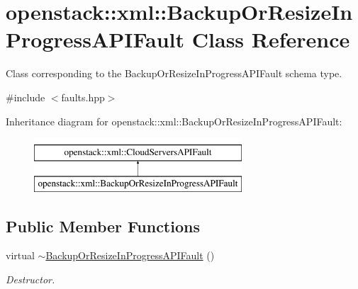 \hypertarget{classopenstack_1_1xml_1_1BackupOrResizeInProgressAPIFault}{
\section{openstack::xml::BackupOrResizeInProgressAPIFault Class Reference}
\label{classopenstack_1_1xml_1_1BackupOrResizeInProgressAPIFault}
}


Class corresponding to the BackupOrResizeInProgressAPIFault schema type.  




{\ttfamily \#include $<$faults.hpp$>$}

Inheritance diagram for openstack::xml::BackupOrResizeInProgressAPIFault:\begin{figure}[H]
\begin{center}
\leavevmode
\includegraphics[height=2.000000cm]{classopenstack_1_1xml_1_1BackupOrResizeInProgressAPIFault}
\end{center}
\end{figure}
\subsection*{Public Member Functions}
\begin{DoxyCompactItemize}
\item 
\hypertarget{classopenstack_1_1xml_1_1BackupOrResizeInProgressAPIFault_a6ac0609d98d73275deb7c9f7d96d07af}{
virtual \hyperlink{classopenstack_1_1xml_1_1BackupOrResizeInProgressAPIFault_a6ac0609d98d73275deb7c9f7d96d07af}{$\sim$BackupOrResizeInProgressAPIFault} ()}
\label{classopenstack_1_1xml_1_1BackupOrResizeInProgressAPIFault_a6ac0609d98d73275deb7c9f7d96d07af}

\begin{DoxyCompactList}\small\item\em Destructor. \item\end{DoxyCompactList}\end{DoxyCompactItemize}
